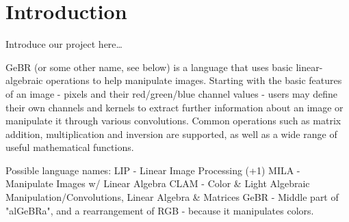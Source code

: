 \chapter{Introduction}

Introduce our project here\ldots

GeBR (or some other name, see below) is a language that uses basic linear-algebraic operations to help manipulate images. Starting with the basic features of an image - pixels and their red/green/blue channel values - users may define their own channels and kernels to extract further information about an image or manipulate it through various convolutions. Common operations such as matrix addition, multiplication and inversion are supported, as well as a wide range of useful mathematical functions. 

Possible language names:
LIP - Linear Image Processing (+1)
MILA - Manipulate Images w/ Linear Algebra
CLAM - Color & Light Algebraic Manipulation/Convolutions, Linear Algebra & Matrices
GeBR - Middle part of "alGeBRa", and a rearrangement of RGB - because it manipulates colors.
